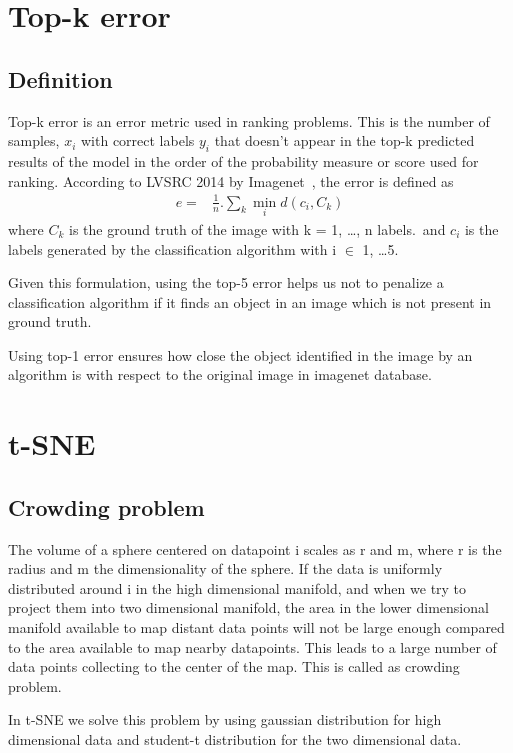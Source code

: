 \documentclass{article}
\begin{document}
\section{Top-k error}
\subsection{Definition}
Top-k error is an error metric used in ranking problems.  
This is the number of samples, $x_{i}$ with correct labels $ y_{i} $ that doesn't appear in the top-k predicted results of the model in the order of the probability measure or score used for ranking.  
According to LVSRC 2014 by Imagenet~\cite{ILSVRC15}, the error is defined as
\begin{align*}
  e =& \frac{1}{n}. \sum_{k} \min_{i} d(c_{i}, C_{k})
\end{align*}
where $C_{k}$ is the ground truth of the image with k = 1, \ldots, n labels.\ 
and $c_{i}$ is the labels generated by the classification algorithm with i $\in$ 1, \ldots 5.

Given this formulation, using the top-5 error helps us not to penalize a classification algorithm if it finds an object in an image which is not present in ground truth.

Using top-1 error ensures how close the object identified in the image by an algorithm is with respect to the original image in imagenet database.

\section{t-SNE}
\subsection{Crowding problem}
The volume of a sphere centered on datapoint i scales as r and m, where r is the radius and m the dimensionality of the sphere.  If the data is uniformly distributed around i in the high dimensional manifold, and when we try to project them into two dimensional manifold, the area in the lower dimensional manifold available to map distant data points will not be large enough compared to the area available to map nearby datapoints.  This leads to a large number of data points collecting to the center of the map.  This is called as crowding problem.

In t-SNE we solve this problem by using gaussian distribution for high dimensional data and student-t distribution for the two dimensional data.~\cite{van2008visualizing}
\end{document}

